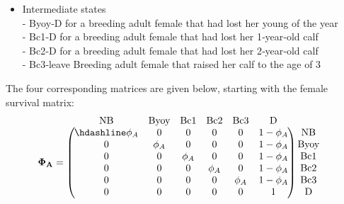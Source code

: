 \documentclass[
  12pt,
]{krantz}
\providecommand{\tightlist}{%
  \setlength{\itemsep}{0pt}\setlength{\parskip}{0pt}}
\begin{document}
\begin{itemize}
\tightlist
\item
  Intermediate states\\
  - Byoy‐D for a breeding adult female that had lost her young of the year\\
  - Bc1‐D for a breeding adult female that had lost her 1‐year‐old calf\\
  - Bc2‐D for a breeding adult female that had lost her 2‐year‐old calf\\
  - Bc3‐leave Breeding adult female that raised her calf to the age of 3
\end{itemize}

The four corresponding matrices are given below, starting with the female survival matrix:
\[
\begin{matrix}
& \\
\mathbf{\Phi_A} =
\left ( \vphantom{ \begin{matrix} 12 \\ 12 \\ 12 \\ 12 \\ 12 \\ 12 \end{matrix} } \right .
\end{matrix}
\hspace{-1.2em}
\begin{matrix}
\text{NB} & \text{Byoy} & \text{Bc1} & \text{Bc2} & \text{Bc3} & \text{D} \\ \hdashline
\phi_A & 0      & 0      & 0      & 0      & 1 - \phi_A \\
0      & \phi_A & 0      & 0      & 0      & 1 - \phi_A \\
0      & 0      & \phi_A & 0      & 0      & 1 - \phi_A \\
0      & 0      & 0      & \phi_A & 0      & 1 - \phi_A \\
0      & 0      & 0      & 0      & \phi_A & 1 - \phi_A \\
0      & 0      & 0      & 0      & 0      & 1
\end{matrix}
\hspace{-0.2em}
\begin{matrix}
& \\
\left . \vphantom{ \begin{matrix} 12 \\ 12 \\ 12 \\ 12 \\ 12 \\ 12 \end{matrix} } \right )
\begin{matrix}
\text{NB} \\
\text{Byoy} \\
\text{Bc1} \\
\text{Bc2} \\
\text{Bc3} \\
\text{D}
\end{matrix}
\end{matrix}
\]
\end{document}
